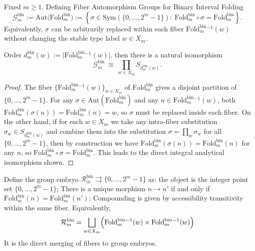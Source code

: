 \begin{definition}\label{def:fold-bin-gauge-group}
Fixed \(m\ge 1\). Defining Fiber Automorphism Groups for Binary Interval Folding
\[
\mathcal{G}^{\mathrm{bin}}_m
:=
\mathrm{Aut}\!\bigl(\mathrm{Fold}^{\mathrm{bin}}_m\bigr)
:=
\left\{\sigma\in \mathrm{Sym}(\{0,\dots,2^m-1\}):\ \mathrm{Fold}^{\mathrm{bin}}_m\circ\sigma=\mathrm{Fold}^{\mathrm{bin}}_m\right\}.
\]
Equivalently, \(\sigma\) can be arbitrarily replaced within each fiber \(\mathrm{Fold}^{\mathrm{bin}}_m{}^{-1}(w)\) without changing the stable type label \(w\in X_m\).
\end{definition}

\begin{proposition}\label{prop:fold-bin-gauge-decomposition}
Order \(d^{\mathrm{bin}}_m(w):=\bigl|\mathrm{Fold}^{\mathrm{bin}}_m{}^{-1}(w)\bigr|\).
then there is a natural isomorphism
\[
\mathcal{G}^{\mathrm{bin}}_m\ \cong\ \prod_{w\in X_m} S_{d^{\mathrm{bin}}_m(w)}.
\]
\end{proposition}
\begin{proof}
The fiber \(\{\mathrm{Fold}^{\mathrm{bin}}_m{}^{-1}(w)\}_{w\in X_m}\) of \(\mathrm{Fold}^{\mathrm{bin}}_m\) gives a disjoint partition of \(\{0,\dots,2^m-1\}\).
For any \(\sigma\in\mathrm{Aut}(\mathrm{Fold}^{\mathrm{bin}}_m)\) and any \(n\in \mathrm{Fold}^{\mathrm{bin}}_m{}^{-1}(w)\), both
\(\mathrm{Fold}^{\mathrm{bin}}_m(\sigma(n))=\mathrm{Fold}^{\mathrm{bin}}_m(n)=w\), so \(\sigma\) must be replaced inside each fiber.
On the other hand, if for each \(w\in X_m\) we take any intra-fiber substitution \(\sigma_w\in S_{d^{\mathrm{bin}}_m(w)}\) and combine them into the substitution \(\sigma=\prod_w\sigma_w\) for all \(\{0,\dots,2^m-1\}\), then by construction we have \(\mathrm{Fold}^{\mathrm{bin}}_m(\sigma(n))=\mathrm{Fold}^{\mathrm{bin}}_m(n)\) for any \(n\), so \(\mathrm{Fold}^{\mathrm{bin}}_m\circ\sigma=\mathrm{Fold}^{\mathrm{bin}}_m\).
This leads to the direct integral analytical isomorphism shown.
\end{proof}

\begin{definition}\label{def:fold-bin-fiber-groupoid}
Define the group embryo \(\mathcal{R}^{\mathrm{bin}}_m\rightrightarrows \{0,\dots,2^m-1\}\) as: the object is the integer point set \(\{0,\dots,2^m-1\}\);
There is a unique morphism \(n\to n'\) if and only if \(\mathrm{Fold}^{\mathrm{bin}}_m(n)=\mathrm{Fold}^{\mathrm{bin}}_m(n')\);
Compounding is given by accessibility transitivity within the same fiber.
Equivalently,
\[
\mathcal{R}^{\mathrm{bin}}_m
=\bigsqcup_{w\in X_m}\Bigl(\mathrm{Fold}^{\mathrm{bin}}_m{}^{-1}(w)\times \mathrm{Fold}^{\mathrm{bin}}_m{}^{-1}(w)\Bigr)
\]
It is the direct merging of fibers to group embryos.
\end{definition}

